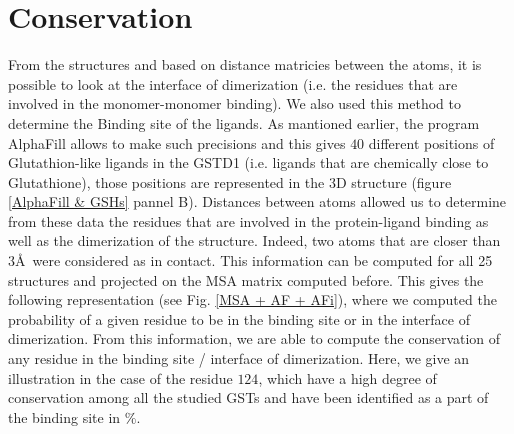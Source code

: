\section{Conservation}

\noindent From the structures and based on distance matricies between the atoms, it is possible to look at the interface of dimerization (i.e. the residues that are involved in the monomer-monomer binding). We also used this method to determine the Binding site of the ligands. As mantioned earlier, the program AlphaFill allows to make such precisions and this gives $40$ different positions of Glutathion-like ligands in the GSTD1 (i.e. ligands that are chemically close to Glutathione), those positions are represented in the 3D structure (figure \ref{AlphaFill & GSHs} pannel B). Distances between atoms allowed us to determine from these data the residues that are involved in the protein-ligand binding as well as the dimerization of the structure. Indeed, two atoms that are closer than $3$\AA ~were considered as in contact. This information can be computed for all 25 structures and projected on the MSA matrix computed before. This gives the following representation (see Fig. \ref{MSA + AF + AFi}), where we computed the probability of a given residue to be in the binding site or in the interface of dimerization. From this information, we are able to compute the conservation of any residue in the binding site / interface of dimerization. Here, we give an illustration in the case of the residue $124$, which have a high degree of conservation among all the studied GSTs and have been identified as a part of the binding site in $\%$.

